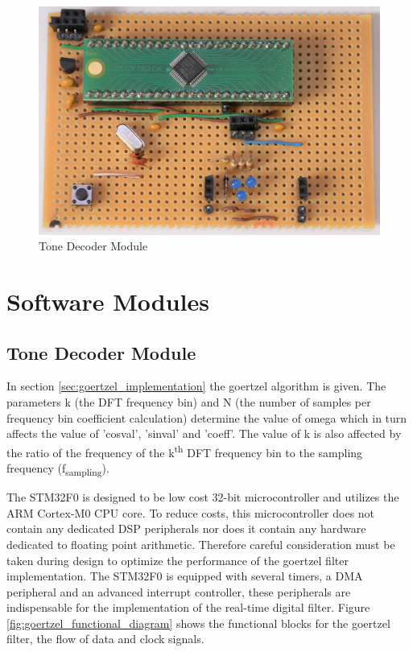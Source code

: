\begin{figure}[H]
	\centering
	\includegraphics[width=.6\textwidth]{figures/modules/goertzel_filter.jpg}
	\caption{Tone Decoder Module}
	\label{fig:module_tone_decoder}
\end{figure}



\section{Software Modules}

\subsection{Tone Decoder Module}
\label{tone_decoder_software}

In section \ref{sec:goertzel_implementation} the goertzel algorithm is given. The parameters k (the DFT frequency bin) and N (the number of samples per frequency bin coefficient calculation) determine the value of omega which in turn affects the value of 'cosval', 'sinval' and 'coeff'. The value of k is also affected by the ratio of the frequency of the k\textsuperscript{th} DFT frequency bin to the sampling frequency (f\textsubscript{sampling}).

The STM32F0 is designed to be low cost 32-bit microcontroller and utilizes the ARM Cortex-M0 CPU core. To reduce costs, this microcontroller does not contain any dedicated DSP peripherals nor does it contain any hardware dedicated to floating point arithmetic. Therefore careful consideration must be taken during design to optimize the performance of the goertzel filter implementation. The STM32F0 is equipped with several timers, a DMA peripheral and an advanced interrupt controller, these peripherals are indispensable for the implementation of the real-time digital filter. Figure \ref{fig:goertzel_functional_diagram} shows the functional blocks for the goertzel filter, the flow of data and clock signals.

